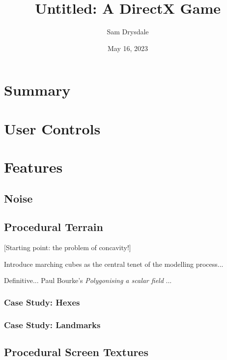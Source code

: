 \documentclass[a4paper, 11pt]{article}
\title{Untitled: A DirectX Game}
\author{Sam Drysdale}
\date{May 16, 2023}
\begin{document}
\graphicspath{{./Images/}}
\maketitle
\tableofcontents
\begin{flushleft}

\section{Summary}


\section{User Controls}


\section{Features}

\subsection{Noise} %

\subsection{Procedural Terrain} %

[Starting point: the problem of concavity!]

\vspace{10pt}\noindent
Introduce marching cubes as the central tenet of the modelling process...

\vspace{10pt}\noindent
Definitive... Paul Bourke's \textit{Polygonising a scalar field} \citeyearpar{bourkeMarchingCubes}...

\subsubsection{Case Study: Hexes}

\subsubsection{Case Study: Landmarks}

\subsection{Procedural Screen Textures} %


\end{flushleft}
\end{document}
